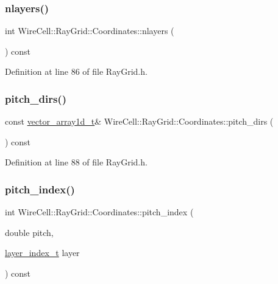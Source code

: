 \subsubsection{\texorpdfstring{nlayers()}{nlayers()}}
{\footnotesize\ttfamily int Wire\+Cell\+::\+Ray\+Grid\+::\+Coordinates\+::nlayers (\begin{DoxyParamCaption}{ }\end{DoxyParamCaption}) const\hspace{0.3cm}{\ttfamily [inline]}}



Definition at line 86 of file Ray\+Grid.\+h.

\mbox{\label{class_wire_cell_1_1_ray_grid_1_1_coordinates_a46010489c24f18c5946bc08f671ec1a9}} 
\subsubsection{\texorpdfstring{pitch\+\_\+dirs()}{pitch\_dirs()}}
{\footnotesize\ttfamily const \hyperlink{namespace_wire_cell_1_1_ray_grid_a0406c6b8a3dc5f9127d665b6a2e6854a}{vector\+\_\+array1d\+\_\+t}\& Wire\+Cell\+::\+Ray\+Grid\+::\+Coordinates\+::pitch\+\_\+dirs (\begin{DoxyParamCaption}{ }\end{DoxyParamCaption}) const\hspace{0.3cm}{\ttfamily [inline]}}



Definition at line 88 of file Ray\+Grid.\+h.

\mbox{\label{class_wire_cell_1_1_ray_grid_1_1_coordinates_a8b371cd1c56cfdf12677d69f9e58fcbc}} 
\subsubsection{\texorpdfstring{pitch\+\_\+index()}{pitch\_index()}}
{\footnotesize\ttfamily int Wire\+Cell\+::\+Ray\+Grid\+::\+Coordinates\+::pitch\+\_\+index (\begin{DoxyParamCaption}\item[{double}]{pitch,  }\item[{\hyperlink{namespace_wire_cell_1_1_ray_grid_ab7562e54b58eede813d5b70b5eb85812}{layer\+\_\+index\+\_\+t}}]{layer }\end{DoxyParamCaption}) const\hspace{0.3cm}{\ttfamily [inline]}}



